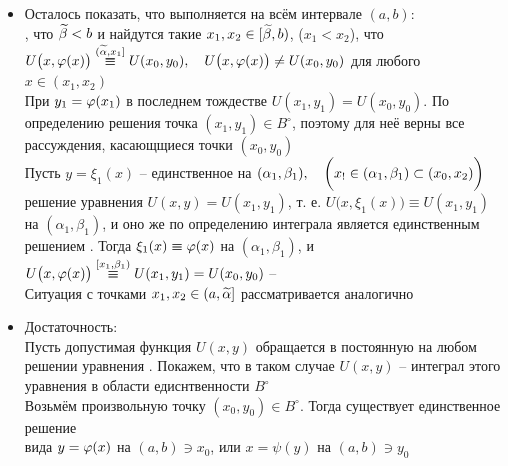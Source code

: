 \begin{iproof}
\begin{itemize}
        Иными словами, сущетвуют такие интервалы $ (\vawe{a}, \vawe{b}) $ и $ (\vawe\alpha, \vawe\beta) $, что
        $$ x_0 \in (\vawe{a}, \vawe{b}) \sub (a, b), \quad y_0 \in (\vawe\alpha, \vawe\beta) \sub (\alpha, \beta), \qquad y \overset{(\vawe\alpha, \vawe\beta)}\equiv \vphi \big( \eta(y) \big), \quad x \overset{(\vawe{a}, \vawe{b})}\equiv \eta \big( \vphi(x) \big) $$
        Поэтому справедлива доказывающая  цепочка равенств:
        $$ U \big( x, \vphi(x) \big) \overset{)\vawe{a}, \vawe{b}}\equiv U \bigg( \eta \big( \vphi(x) \big), \vphi(x) \bigg) \overset{(\vawe\alpha, \vawe\beta)}\equiv U \big( \eta(y), y \big) \overset{(\vawe\alpha, \vawe\beta)}\equiv U(x_0, y_0) $$
        \item Осталось показать, что  выполняется на всём интервале $ (a, b) $: \\
        , что $ \widetilde\beta < b $ и найдутся такие $ x_1, x_2 \in [\widetilde\beta, b) $, ($ x_1 < x_2 $), что $ U \big( x, \vphi(x) \big) \overset{(\vawe\alpha, x_1]}\equiv U(x_0, y_0), \quad U \big( x, \vphi(x) \big) \neq U(x_0, y_0) $ для любого $ x \in (x_1, x_2) $ \\
        При $ y_1 = \varphi(x_1) $ в последнем тождестве $ U(x_1, y_1) = U(x_0, y_0) $. По определению решения точка $ (x_1, y_1) \in B^\circ $, поэтому для неё верны все рассуждения, касающщиеся точки $ (x_0, y_0) $ \\
        Пусть $ y = \xi_1(x) $ -- единственное на $ (\alpha_1, \beta_1), \quad \bigg( x_! \in (\alpha_1, \beta_1) \subset (x_0, x_2) \bigg) $ решение уравнения $ U(x, y) = U(x_1, y_1) $, т. е. $ U \big( x, \xi_1(x) \big) \equiv U(x_1, y_1) $ на $ (\alpha_1, \beta_1) $, и оно же по определению интеграла является единственным решением . Тогда $ \xi_1(x) \equiv \vphi(x) $ на $ (\alpha_1, \beta_1) $, и $ U \big( x, \vphi(x) \big) \overset{[x_1, \beta_1)}\equiv U(x_1, y_1) = U(x_0, y_0) $ -- \contra \\
        Ситуация с точками $ x_1, x_2 \in (a, \widetilde\alpha] $ рассматривается аналогично
        \item Достаточность: \\
        Пусть допустимая функция $ U(x, y) $ обращается в постоянную на любом решении уравнения . Покажем, что в таком случае $ U(x, y) $ -- интеграл этого уравнения в области едиснтвенности $ B^\circ $ \\
        Возьмём произвольную точку $ (x_0, y_0) \in B^\circ $. Тогда существует единственное решение \\  вида $ y = \varphi(x) $ на $ (a ,b) \ni x_0 $, или $ x = \psi(y) $ на $ (a, b) \ni y_0 $ \\

\end{itemize}
\end{iproof}
